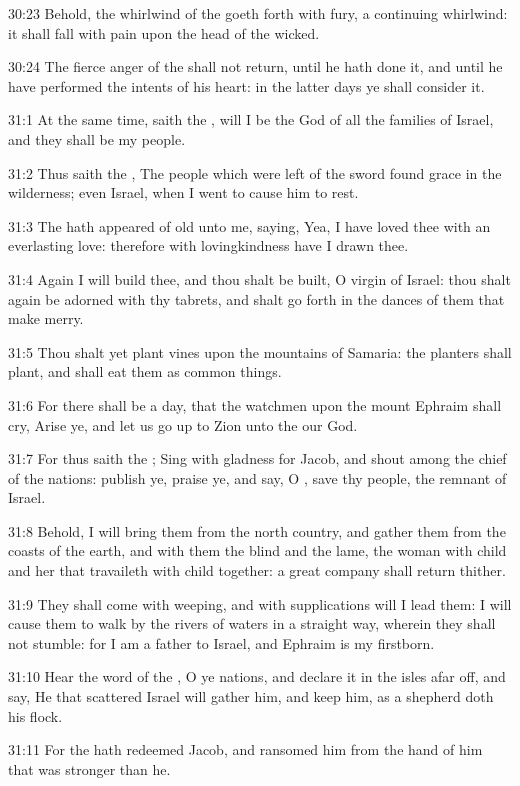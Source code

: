 30:23 Behold, the whirlwind of the \LORD goeth forth with fury, a
continuing whirlwind: it shall fall with pain upon the head of the
wicked.

30:24 The fierce anger of the \LORD shall not return, until he hath
done it, and until he have performed the intents of his heart: in the
latter days ye shall consider it.

31:1 At the same time, saith the \LORD, will I be the God of all the
families of Israel, and they shall be my people.

31:2 Thus saith the \LORD, The people which were left of the sword
found grace in the wilderness; even Israel, when I went to cause him
to rest.

31:3 The \LORD hath appeared of old unto me, saying, Yea, I have loved
thee with an everlasting love: therefore with lovingkindness have I
drawn thee.

31:4 Again I will build thee, and thou shalt be built, O virgin of
Israel: thou shalt again be adorned with thy tabrets, and shalt go
forth in the dances of them that make merry.

31:5 Thou shalt yet plant vines upon the mountains of Samaria: the
planters shall plant, and shall eat them as common things.

31:6 For there shall be a day, that the watchmen upon the mount
Ephraim shall cry, Arise ye, and let us go up to Zion unto the \LORD
our God.

31:7 For thus saith the \LORD; Sing with gladness for Jacob, and shout
among the chief of the nations: publish ye, praise ye, and say, O
\LORD, save thy people, the remnant of Israel.

31:8 Behold, I will bring them from the north country, and gather them
from the coasts of the earth, and with them the blind and the lame,
the woman with child and her that travaileth with child together: a
great company shall return thither.

31:9 They shall come with weeping, and with supplications will I lead
them: I will cause them to walk by the rivers of waters in a straight
way, wherein they shall not stumble: for I am a father to Israel, and
Ephraim is my firstborn.

31:10 Hear the word of the \LORD, O ye nations, and declare it in the
isles afar off, and say, He that scattered Israel will gather him, and
keep him, as a shepherd doth his flock.

31:11 For the \LORD hath redeemed Jacob, and ransomed him from the hand
of him that was stronger than he.

